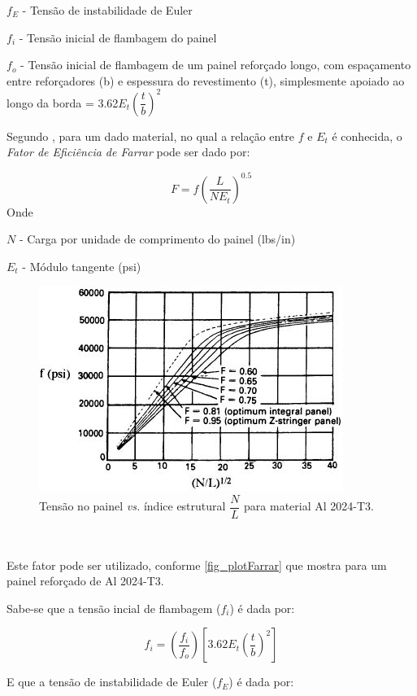 $f_E$ - Tensão de instabilidade de Euler\

$f_i$ - Tensão inicial de flambagem do painel\

$f_o$ - Tensão inicial de flambagem de um painel reforçado longo, com espaçamento entre reforçadores (b) e espessura do revestimento (t), simplesmente apoiado ao longo da borda = 3.62$E_t$$(\dfrac{t}{b})^2$\

Segundo \cite{niu1997airframe}, para um dado material, no qual a relação entre $f$ e $E_t$ é conhecida, o \emph{Fator de Eficiência de Farrar} pode ser dado por:

\begin{equation} \label{Farrar}
F = f(\dfrac{L}{N E_t})^{0.5}
\end{equation}
Onde

$N$ - Carga por unidade de comprimento do painel (lbs/in)\

$E_t$ - Módulo tangente (psi)

\begin{figure}[h]
	\caption{\label{fig_plotFarrar}Tensão no painel \emph{vs.} índice estrutural $\dfrac{N}{L}$ para material Al 2024-T3.}
  \centering
  \includegraphics[scale=1.0]{figura/PlotFarrar}
\end{figure}
\

Este fator pode ser utilizado, conforme \autoref{fig_plotFarrar} que mostra para um painel reforçado de Al 2024-T3.

Sabe-se que a tensão incial de flambagem ($f_i$) é dada por:

\begin{equation} \label{InitialBuck}
f_i = (\dfrac{f_i}{f_o})[{3.62E_t(\dfrac{t}{b})^2}]
\end{equation}

E que a tensão de instabilidade de Euler ($f_E$) é dada por:


